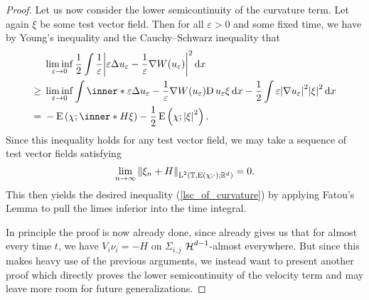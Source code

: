 \begin{proof}
	Let us now consider the lower semicontinuity of the curvature 
	term. Let again $ \xi $ be some test vector field. Then for all $ 
	\varepsilon > 0 $ and some fixed time, we have by Young's inequality and 
	the Cauchy--Schwarz inequality that
	\begin{align*}
		& 
		\liminf_{ \varepsilon \to 0 }
		\frac{ 1 }{ 2 }
		\int
			\frac{ 1 }{ \varepsilon }
			\abs{ 
				\varepsilon
				\Delta u_{ \varepsilon }
				-
				\frac{ 1 }{ \varepsilon }
				\nabla W ( u_{ \varepsilon } )
			}^{ 2 }
		\dd{ x }
		\\
		\geq{} &
		\liminf_{ \varepsilon \to 0 }
		\int
			\inner*{ 
				\varepsilon
				\Delta u_{ \varepsilon }
				-
				\frac{ 1 }{ \varepsilon }
				\nabla W ( u_{ \varepsilon } )
			}{
				\diff u_{ \varepsilon } \xi
			}
		\dd{ x }
		-
		\frac{ 1 }{ 2 }
		\int 
			\varepsilon
			\abs{ \nabla u_{ \varepsilon } }^{ 2 }
			\abs{ \xi }^{ 2 }
		\dd{ x }
		\\
		={} &
		-\energy \left( \chi ; \inner*{ H }{ \xi } \right)
		-
		\frac{ 1 }{ 2 }
		\energy \left( \chi ; \abs{ \xi }^{ 2 } \right).
	\end{align*}
	Since this inequality holds for any test vector field, we may take a 
	sequence of test vector fields satisfying
	\begin{equation*}
		\lim_{ n \to \infty }
			\norm{ \xi_{ n } + H }_{ \operatorname{L}^{ 2 } \left( \operatorname{\mathbb{T}} , \operatorname{E} 
			( 
			\chi ; \cdot ) ; \mathbb{ R }^{ d } \right) } 
		=
		0.
	\end{equation*}
	This then yields the desired inequality (\ref{lsc_of_curvature}) by 
	applying Fatou's Lemma to pull the limes inferior into the time integral.
	
	In principle the proof is now already done, since 
	 already gives us that for almost every 
	time $ t $, we have $ V_{ i } \nu_{ i } = - H $ on $ \Sigma_{ i , j 
	} $ $ \operatorname{\mathcal{H}}^{ d-  1 } $-almost everywhere. But since this makes heavy use of 
	the previous arguments, we instead want to present another proof which 
	directly proves the lower semicontinuity of the velocity term and may leave 
	more room for future generalizations.
	

\end{proof}
